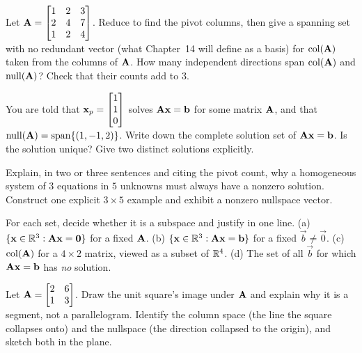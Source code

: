 \begin{exercise}\label{ch12:ex-colbasis}
Let $\mathbf{A}=\begin{bmatrix}1 & 2 & 3\\2 & 4 & 7\\1 & 2 & 4\end{bmatrix}$. Reduce
to find the pivot columns, then give a spanning set with no redundant vector (what Chapter~14 will define as a basis) for $\operatorname{col}(\mathbf{A})$ taken from the
columns of $\mathbf{A}$. How many independent directions span $\operatorname{col}(\mathbf{A})$ and $\operatorname{null}(\mathbf{A})$? Check that their counts add to $3$.
\end{exercise}

\begin{exercise}\label{ch12:ex-complete}
You are told that $\mathbf{x}_p=\begin{bmatrix}1\\1\\0\end{bmatrix}$ solves $\mathbf{A}\mathbf{x}=\mathbf{b}$ for
some matrix $\mathbf{A}$, and that $\operatorname{null}(\mathbf{A})=\operatorname{span}\{(1,-1,2)\}$. Write down the
complete solution set of $\mathbf{A}\mathbf{x}=\mathbf{b}$. Is the solution unique? Give
two distinct solutions explicitly.
\end{exercise}

\begin{exercise}\label{ch12:ex-wide}
Explain, in two or three sentences and citing the pivot count, why a homogeneous
system of $3$ equations in $5$ unknowns must always have a nonzero solution.
Construct one explicit $3\times5$ example and exhibit a nonzero nullspace vector.
\end{exercise}

\begin{exercise}\label{ch12:ex-tf}
For each set, decide whether it is a subspace and justify in one line.
(a) $\{\mathbf{x}\in\mathbb{R}^3 : \mathbf{A}\mathbf{x}=\mathbf{0}\}$ for a fixed $\mathbf{A}$.
(b) $\{\mathbf{x}\in\mathbb{R}^3 : \mathbf{A}\mathbf{x}=\mathbf{b}\}$ for a fixed $\vec{b}\neq\vec0$.
(c) $\operatorname{col}(\mathbf{A})$ for a $4\times2$ matrix, viewed as a subset of $\mathbb{R}^4$.
(d) The set of all $\vec{b}$ for which $\mathbf{A}\mathbf{x}=\mathbf{b}$ has \emph{no}
solution.
\end{exercise}

\begin{exercise}\label{ch12:ex-collapse}
Let $\mathbf{A}=\begin{bmatrix}2 & 6\\1 & 3\end{bmatrix}$. Draw the unit square's
image under $\mathbf{A}$ and explain why it is a segment, not a parallelogram.
Identify the column space (the line the square collapses onto) and the nullspace
(the direction collapsed to the origin), and sketch both in the plane.
\end{exercise}

